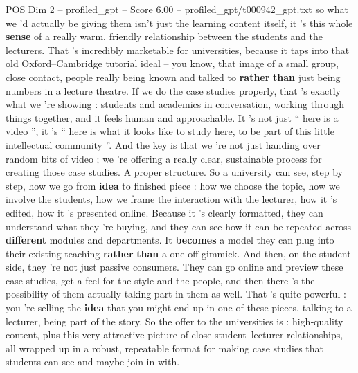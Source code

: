 \begin{textsample}{POS Dim 2 – profiled\_gpt – Score 6.00 – profiled\_gpt/t000942\_gpt.txt}  \label{ex:f2_pos_013}
so what we ’d actually be giving them isn't just the learning content itself, it ’s this whole \textbf{sense} of a really warm, friendly relationship between the students and the lecturers.
That ’s incredibly marketable for universities, because it taps into that old Oxford–Cambridge tutorial ideal – you know, that image of a small group, close contact, people really being known and talked to \textbf{rather} \textbf{than} just being numbers in a lecture theatre.
If we do the case studies properly, that ’s exactly what we ’re showing : students and academics in conversation, working through things together, and it feels human and approachable.
It ’s not just “ here is a video ”, it ’s “ here is what it looks like to study here, to be part of this little intellectual community ”.
And the key is that we ’re not just handing over random bits of video ; we ’re offering a really clear, sustainable process for creating those case studies.
A proper structure.
So a university can see, step by step, how we go from \textbf{idea} to finished piece : how we choose the topic, how we involve the students, how we frame the interaction with the lecturer, how it ’s edited, how it ’s presented online.
Because it ’s clearly formatted, they can understand what they ’re buying, and they can see how it can be repeated across \textbf{different} modules and departments.
It \textbf{becomes} a model they can plug into their existing teaching \textbf{rather} \textbf{than} a one‑off gimmick.
And then, on the student side, they ’re not just passive consumers.
They can go online and preview these case studies, get a feel for the style and the people, and then there ’s the possibility of them actually taking part in them as well.
That ’s quite powerful : you ’re selling the \textbf{idea} that you might end up in one of these pieces, talking to a lecturer, being part of the story.
So the offer to the universities is : high‑quality content, plus this very attractive picture of close student–lecturer relationships, all wrapped up in a robust, repeatable format for making case studies that students can see and maybe join in with.

\end{textsample}
